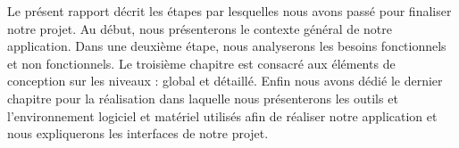 Le présent rapport décrit les étapes par lesquelles nous avons passé pour finaliser notre projet. Au début, nous présenterons le contexte général de notre application. Dans une deuxième étape, nous analyserons les besoins fonctionnels et non fonctionnels. Le troisième chapitre est consacré aux éléments de conception sur les niveaux : global et détaillé. Enfin nous avons dédié le dernier chapitre pour la réalisation dans laquelle nous présenterons les outils et l’environnement logiciel et matériel utilisés afin de réaliser notre application et nous expliquerons les interfaces de notre projet.\\

